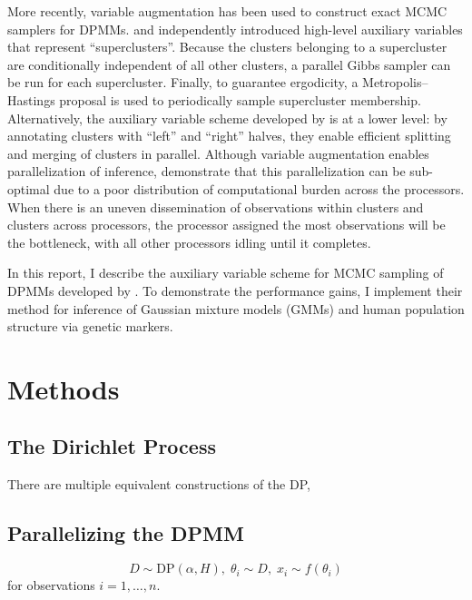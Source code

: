\documentclass{uwstat572}
\begin{document}
More recently, variable augmentation has been used to construct exact MCMC samplers for DPMMs.
\citet{WDX13} and \citet{Lov+13} independently introduced high-level auxiliary variables that represent ``superclusters''.
Because the clusters belonging to a supercluster are conditionally independent of all other clusters, a parallel Gibbs sampler can be run for each supercluster.
Finally, to guarantee ergodicity, a Metropolis--Hastings proposal is used to periodically sample supercluster membership.
Alternatively, the auxiliary variable scheme developed by \citet{CF13,CF14} is at a lower level: by annotating clusters with ``left'' and ``right'' halves, they enable efficient splitting and merging of clusters in parallel.
Although variable augmentation enables parallelization of inference, \citet{GG14} demonstrate that this parallelization can be sub-optimal due to a poor distribution of computational burden across the processors.
When there is an uneven dissemination of observations within clusters and clusters across processors, the processor assigned the most observations will be the bottleneck, with all other processors idling until it completes.

In this report, I describe the auxiliary variable scheme for MCMC sampling of DPMMs developed by \citet{WDX13}.
To demonstrate the performance gains, I implement their method for inference of Gaussian mixture models (GMMs) and human population structure via genetic markers.

\section{Methods}



\subsection{The Dirichlet Process}


There are multiple equivalent constructions of the DP,

\subsection{Parallelizing the DPMM}

\begin{equation}
  D \sim \text{DP}\left(\alpha, H\right),\;
  \theta_i \sim D, \;
  x_i \sim f\left(\theta_i\right)
  \label{eq:dpmm}
\end{equation}
for observations $i = 1,\ldots,n$.
\end{document}
